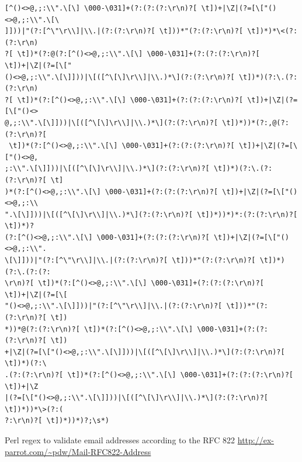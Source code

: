 \documentclass{beamer}
\begin{document}
\begin{frame}[fragile]
\begingroup
 \fontsize{6pt}{8pt}\selectfont
\begin{verbatim}
[^()<>@,;:\\".\[\] \000-\031]+(?:(?:(?:\r\n)?[ \t])+|\Z|(?=[\["()<>@,;:\\".\[\
]]))|"(?:[^\"\r\\]|\\.|(?:(?:\r\n)?[ \t]))*"(?:(?:\r\n)?[ \t])*)*\<(?:(?:\r\n)
?[ \t])*(?:@(?:[^()<>@,;:\\".\[\] \000-\031]+(?:(?:(?:\r\n)?[ \t])+|\Z|(?=[\["
()<>@,;:\\".\[\]]))|\[([^\[\]\r\\]|\\.)*\](?:(?:\r\n)?[ \t])*)(?:\.(?:(?:\r\n)
?[ \t])*(?:[^()<>@,;:\\".\[\] \000-\031]+(?:(?:(?:\r\n)?[ \t])+|\Z|(?=[\["()<>
@,;:\\".\[\]]))|\[([^\[\]\r\\]|\\.)*\](?:(?:\r\n)?[ \t])*))*(?:,@(?:(?:\r\n)?[
 \t])*(?:[^()<>@,;:\\".\[\] \000-\031]+(?:(?:(?:\r\n)?[ \t])+|\Z|(?=[\["()<>@,
;:\\".\[\]]))|\[([^\[\]\r\\]|\\.)*\](?:(?:\r\n)?[ \t])*)(?:\.(?:(?:\r\n)?[ \t]
)*(?:[^()<>@,;:\\".\[\] \000-\031]+(?:(?:(?:\r\n)?[ \t])+|\Z|(?=[\["()<>@,;:\\
".\[\]]))|\[([^\[\]\r\\]|\\.)*\](?:(?:\r\n)?[ \t])*))*)*:(?:(?:\r\n)?[ \t])*)?
(?:[^()<>@,;:\\".\[\] \000-\031]+(?:(?:(?:\r\n)?[ \t])+|\Z|(?=[\["()<>@,;:\\".
\[\]]))|"(?:[^\"\r\\]|\\.|(?:(?:\r\n)?[ \t]))*"(?:(?:\r\n)?[ \t])*)(?:\.(?:(?:
\r\n)?[ \t])*(?:[^()<>@,;:\\".\[\] \000-\031]+(?:(?:(?:\r\n)?[ \t])+|\Z|(?=[\[
"()<>@,;:\\".\[\]]))|"(?:[^\"\r\\]|\\.|(?:(?:\r\n)?[ \t]))*"(?:(?:\r\n)?[ \t])
*))*@(?:(?:\r\n)?[ \t])*(?:[^()<>@,;:\\".\[\] \000-\031]+(?:(?:(?:\r\n)?[ \t])
+|\Z|(?=[\["()<>@,;:\\".\[\]]))|\[([^\[\]\r\\]|\\.)*\](?:(?:\r\n)?[ \t])*)(?:\
.(?:(?:\r\n)?[ \t])*(?:[^()<>@,;:\\".\[\] \000-\031]+(?:(?:(?:\r\n)?[ \t])+|\Z
|(?=[\["()<>@,;:\\".\[\]]))|\[([^\[\]\r\\]|\\.)*\](?:(?:\r\n)?[ \t])*))*\>(?:(
?:\r\n)?[ \t])*))*)?;\s*)
\end{verbatim}
 \endgroup
Perl regex to validate email addresses according to the RFC 822
\url{http://ex-parrot.com/~pdw/Mail-RFC822-Address}
\end{frame}
\end{document}
